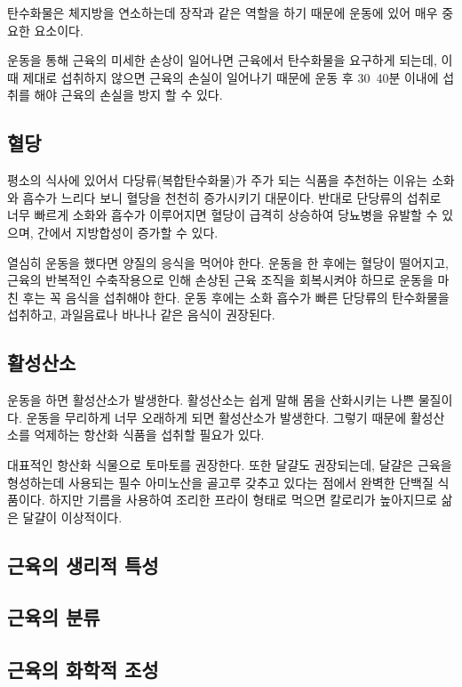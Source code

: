 \documentclass[12pt, a4paper, oneside]{book}
\begin{document}
탄수화물은 체지방을 연소하는데 장작과 같은 역할을 하기 때문에 운동에 있어 매우 중요한 요소이다.


운동을 통해 근육의 미세한 손상이 일어나면 근육에서 탄수화물을 요구하게 되는데, 
이때 제대로 섭취하지 않으면 근육의 손실이 일어나기 때문에 운동 후 30~40분 이내에 섭취를 해야 근육의 손실을 방지 할 수 있다.




	\subsection{혈당}
평소의 식사에 있어서 다당류(복합탄수화물)가 주가 되는 식품을 추천하는 이유는 소화와 흡수가 느리다 보니 혈당을 천천히 증가시키기 대문이다.
반대로 단당류의 섭취로 너무 빠르게 소화와 흡수가 이루어지면 혈당이 급격히 상승하여 당뇨병을 유발할 수 있으며, 간에서 지방합성이 증가할 수 있다.

열심히 운동을 했다면 양질의 응식을 먹어야 한다.
운동을 한 후에는 혈당이 떨어지고, 근육의 반복적인 수축작용으로 인해 손상된 근육 조직을 회복시켜야 하므로 운동을 마친 후는 꼭 음식을 섭취해야 한다.
운동 후에는 소화 흡수가 빠른  단당류의 탄수화물을 섭취하고, 과일음료나 바나나 같은 음식이 권장된다.


	\subsection{활성산소}

운동을 하면 활성산소가 발생한다.
활성산소는 쉽게 말해 몸을 산화시키는 나쁜 물질이다.
운동을 무리하게 너무 오래하게 되면 활성산소가 발생한다.
그렇기 때문에 활성산소를 억제하는 항산화 식품을 섭취할 필요가 있다.

대표적인 항산화 식물으로 토마토를 권장한다.
또한 달걀도 권장되는데, 달걀은 근육을 형성하는데 사용되는 필수 아미노산을 골고루 갖추고 있다는 점에서 완벽한 단백질 식품이다.
하지만 기름을 사용하여 조리한 프라이 형태로 먹으면 칼로리가 높아지므로 삶은 달걀이 이상적이다.



	
	\subsection{근육의 생리적 특성}
	
	
	\subsection{근육의 분류}
	
	
	\subsection{근육의 화학적 조성}
	
\end{document}
